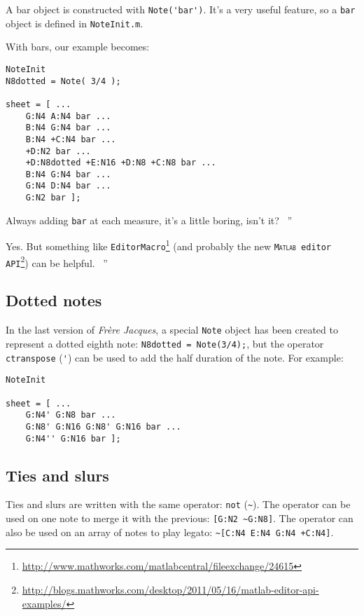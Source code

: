 \documentclass{article}
\newcommand{\matlab}{\textsc{Matlab}\xspace}
\newcommand{\note}{\lstinline!Note!\xspace}
\newcommand{\frerejaques}{\emph{Fr\`ere Jacques}\xspace}
\newcommand{\file}[1]{\texttt{#1}\xspace}
\newcommand{\noteInitFile}{\file{NoteInit.m}}
\newcommand{\exchange}[2]{\texttt{#1}\footnote{\url{#2}}\xspace}
\newenvironment{meenv}{ \par \noindent \makebox[6em][r]{ \textcolor{mecolor}{Me}: `` --~}}{~''}
\newenvironment{myselfenv}{ \par \noindent \makebox[6em][r]{ \textcolor{myselfcolor}{Myself}: `` --~}}{~''}
\newcommand{ \me }[1]{%
\begin{meenv}%
	#1%
\end{meenv} }
\newcommand{ \myself }[1]{%
\begin{myselfenv}%
	#1%
\end{myselfenv} }
\begin{document}
A bar object is constructed with \lstinline!Note('bar')!. It's a very useful feature, so a \lstinline!bar! object is defined in \noteInitFile.

With bars, our example becomes:
\begin{lstlisting}
NoteInit
N8dotted = Note( 3/4 );

sheet = [ ...
	G:N4 A:N4 bar ...
	B:N4 G:N4 bar ...
	B:N4 +C:N4 bar ...
	+D:N2 bar ...
	+D:N8dotted +E:N16 +D:N8 +C:N8 bar ...
	B:N4 G:N4 bar ...
	G:N4 D:N4 bar ...
	G:N2 bar ];
\end{lstlisting}

\me{Always adding \lstinline!bar! at each measure, it's a little boring, isn't it?}
\myself{Yes. But something like \exchange{EditorMacro}{http://www.mathworks.com/matlabcentral/fileexchange/24615} (and probably the new \exchange{\matlab editor API}{http://blogs.mathworks.com/desktop/2011/05/16/matlab-editor-api-examples/}) can be helpful.}

\subsection{Dotted notes}
\label{sec:TutoDottedNotes}

In the last version of \frerejaques, a special \note object has been created to represent a dotted eighth note: \lstinline!N8dotted = Note(3/4);!, but the operator \lstinline!ctranspose! (\lstinline!'!) can be used to add the half duration of the note. For example: \\

\begin{lstlisting}
NoteInit

sheet = [ ...
	G:N4' G:N8 bar ...
	G:N8' G:N16 G:N8' G:N16 bar ...
	G:N4'' G:N16 bar ];
\end{lstlisting}

\subsection{Ties and slurs}

Ties and slurs are written with the same operator: \lstinline!not! (\lstinline!~!). The operator can be used on one note to merge it with the previous: \lstinline![G:N2 ~G:N8]!. The operator can also be used on an array of notes to play legato: \lstinline!~[C:N4 E:N4 G:N4 +C:N4]!.
\end{document}
